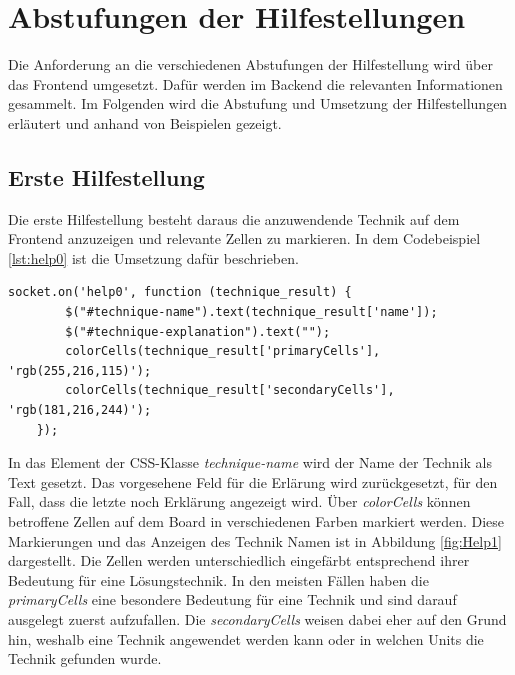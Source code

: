 
\section{Abstufungen der Hilfestellungen}\label{Abstufung}
Die Anforderung an die verschiedenen Abstufungen der Hilfestellung wird über das Frontend umgesetzt. Dafür werden im Backend die relevanten Informationen gesammelt. Im Folgenden wird die Abstufung und Umsetzung der Hilfestellungen erläutert und anhand von Beispielen gezeigt.

\subsection{Erste Hilfestellung}

Die erste Hilfestellung besteht daraus die anzuwendende Technik auf dem Frontend anzuzeigen und relevante Zellen zu markieren.  In dem Codebeispiel \ref{lst:help0} ist die Umsetzung dafür beschrieben.

\begin{lstlisting}[caption={Erste Hilfestellung}, label={lst:help0}]
	socket.on('help0', function (technique_result) {
		$("#technique-name").text(technique_result['name']);
		$("#technique-explanation").text("");
		colorCells(technique_result['primaryCells'], 'rgb(255,216,115)');
		colorCells(technique_result['secondaryCells'], 'rgb(181,216,244)');
	});
\end{lstlisting}

In das Element der CSS-Klasse \textit{technique-name} wird der Name der Technik als Text gesetzt. Das vorgesehene Feld für die Erlärung wird zurückgesetzt, für den Fall, dass die letzte noch Erklärung angezeigt wird. Über \textit{colorCells} können betroffene Zellen auf dem Board in verschiedenen Farben markiert werden. Diese Markierungen und das Anzeigen des Technik Namen ist in Abbildung \ref{fig:Help1} dargestellt. Die Zellen werden unterschiedlich eingefärbt entsprechend ihrer Bedeutung für eine Lösungstechnik. In den meisten Fällen haben die \textit{primaryCells} eine besondere Bedeutung für eine Technik und sind darauf ausgelegt zuerst aufzufallen. Die \textit{secondaryCells} weisen dabei eher auf den Grund hin, weshalb eine Technik angewendet werden kann oder in welchen Units die Technik gefunden wurde.

